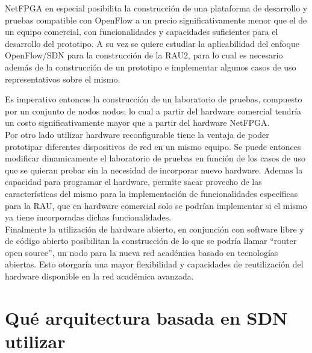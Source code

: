 NetFPGA en especial posibilita la construcci\'on de una plataforma de desarrollo y pruebas compatible con OpenFlow a un precio significativamente menor que el de un equipo comercial, con funcionalidades y capacidades suficientes para el desarrollo del prototipo. A su vez se quiere estudiar la aplicabilidad del enfoque OpenFlow/SDN para la construcción de la RAU2, para lo cual es necesario adem\'as de la construcción de un prototipo e implementar algunos casos de uso representativos sobre el mismo. 

Es imperativo entonces la construcción de un laboratorio de pruebas, compuesto por un conjunto de nodos nodos; lo cual a partir del hardware comercial tendría un costo significativamente mayor que a partir del hardware NetFPGA.\\

Por otro lado utilizar hardware reconfigurable tiene la ventaja de poder prototipar diferentes dispositivos de red en un mismo equipo. Se puede entonces modificar dinamicamente el laboratorio de pruebas en función de los casos de uso que se quieran probar sin la necesidad de incorporar nuevo hardware. Ademas la capacidad para programar el hardware, permite sacar provecho de las características del mismo para la implementaci\'on de funcionalidades especificas para la RAU, que en hardware comercial solo se podrían implementar si el mismo ya tiene incorporadas dichas funcionalidades.\\

Finalmente la utilizaci\'on de hardware abierto, en conjunci\'on con software libre y de código abierto posibilitan la construcci\'on de lo que se podría llamar “router open source”, un nodo para la nueva red académica basado en tecnologías abiertas. Esto otorgaría una mayor flexibilidad y capacidades de reutilizaci\'on del hardware disponible en la red académica avanzada.

\section[Qu\'e arquitectura basada en SDN utilizar]{Qu\'e arquitectura basada en SDN utilizar}


 
